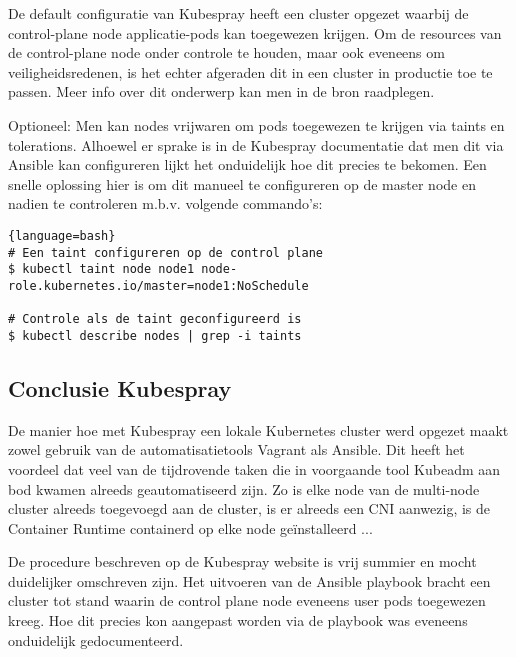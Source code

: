 De default configuratie van Kubespray heeft een cluster opgezet waarbij de control-plane node applicatie-pods kan toegewezen krijgen. Om de resources van de control-plane node onder controle te houden, maar ook eveneens om veiligheidsredenen, is het echter afgeraden dit in een cluster in productie toe te passen. Meer info over dit onderwerp kan men in de bron raadplegen. \autocite{Bailey2016}

Optioneel: Men kan nodes vrijwaren om pods toegewezen te krijgen via taints en tolerations. Alhoewel er sprake is in de Kubespray documentatie dat men dit via Ansible kan configureren lijkt het onduidelijk hoe dit precies te bekomen. \autocite{Kubespray2022b}
Een snelle oplossing hier is om dit manueel te configureren op de master node en nadien te controleren m.b.v. volgende commando's: 
\begin{lstlisting}{language=bash}
# Een taint configureren op de control plane
$ kubectl taint node node1 node-role.kubernetes.io/master=node1:NoSchedule

# Controle als de taint geconfigureerd is
$ kubectl describe nodes | grep -i taints
\end{lstlisting}

\subsection{Conclusie Kubespray}

De manier hoe met Kubespray een lokale Kubernetes cluster werd opgezet maakt zowel gebruik van de automatisatietools Vagrant als Ansible. Dit heeft het voordeel dat veel van de tijdrovende taken die in voorgaande tool Kubeadm aan bod kwamen alreeds geautomatiseerd zijn. Zo is elke node van de multi-node cluster alreeds toegevoegd aan de cluster, is er alreeds een CNI aanwezig, is de Container Runtime containerd op elke node geïnstalleerd ...

De procedure beschreven op de Kubespray website is vrij summier en mocht duidelijker omschreven zijn. Het uitvoeren van de Ansible playbook bracht een cluster tot stand waarin de control plane node eveneens user pods toegewezen kreeg. Hoe dit precies kon aangepast worden via de playbook was eveneens onduidelijk gedocumenteerd. 